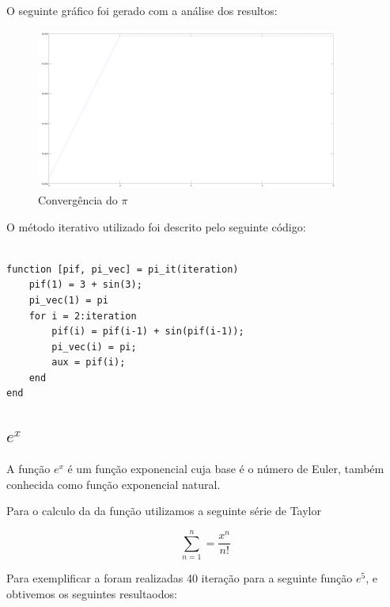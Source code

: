 \documentclass[a4paper]{article}
\begin{document}
O seguinte gráfico foi gerado com a análise dos resultos:

\begin{figure}[H]
    \centering
    \includegraphics[width=100mm]{pi_magic.png}
    \caption{Convergência do $\pi$}
    \label{pi_magic}
\end{figure}

O método iterativo utilizado foi descrito pelo seguinte código:

\begin{lstlisting}

function [pif, pi_vec] = pi_it(iteration)
	pif(1) = 3 + sin(3);
	pi_vec(1) = pi
	for i = 2:iteration
		pif(i) = pif(i-1) + sin(pif(i-1));
		pi_vec(i) = pi;
		aux = pif(i);
	end
end

\end{lstlisting}

\subsection{$e^x$}

	A função $e^x$ é um função exponencial cuja base é o número de Euler,
	também conhecida como função exponencial natural.

	Para o calculo da da função utilizamos a seguinte série de Taylor
	
	\begin{equation}
		\sum_{n=1}^{n} = \frac{x^n}{n!}
	\end{equation}

	Para exemplificar a foram realizadas 40 iteração para a seguinte função $e^5$, e obtivemos os seguintes resultaodos:
\end{document}
